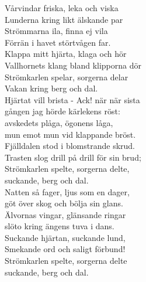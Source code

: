 \documentclass[a6paper, 10pt, twoside]{article}
\begin{document}
\noindent
\begin{center}
\end{center}
\begin{lyrics}
Vårvindar friska, leka och viska\\
Lunderna kring likt älskande par\\
Strömmarna ila, finna ej vila\\
Förrän i havet störtvågen far.\\
Klappa mitt hjärta, klaga och hör\\
Vallhornets klang bland klipporna dör\\
Strömkarlen spelar, sorgerna delar\\
Vakan kring berg och dal.
\vspace{5pt}\\
Hjärtat vill brista - Ack! när när sista\\
gången jag hörde kärlekens röst:\\
avskedets plåga, ögonens låga,\\
mun emot mun vid klappande bröst.\\
Fjälldalen stod i blomstrande skrud.\\
Trasten slog drill på drill för sin brud;\\
Strömkarlen spelte, sorgerna delte,\\
suckande, berg och dal.
\vspace{5pt}\\
Natten så fager, ljus som en dager,\\
göt över skog och bölja sin glans.\\
Älvornas vingar, glänsande ringar\\
slöto kring ängens tuva i dans.\\
Suckande hjärtan, suckande lund,\\
Smekande ord och saligt förbund!\\
Strömkarlen spelte, sorgerna delte\\
suckande, berg och dal.


\end{lyrics}
\end{document}
